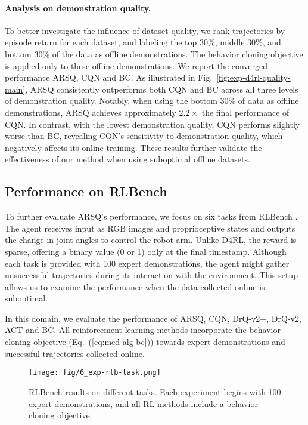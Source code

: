 \paragraph{Analysis on demonstration quality.}
To better investigate the influence of dataset quality, we rank trajectories by episode return for each dataset, and labeling the top $30$\%, middle $30$\%, and bottom $30$\% of the data as offline demonstrations.
The behavior cloning objective is applied only to these offline demonstrations. 
We report the converged performance ARSQ, CQN and BC.
As illustrated in Fig.~\ref{fig:exp-d4rl-quality-main}, ARSQ consistently outperforms both CQN and BC across all three levels of demonstration quality. 
Notably, when using the bottom $30$\% of data as offline demonstrations, ARSQ achieves approximately $2.2 \times$ the final performance of CQN.
In contrast, with the lowest demonstration quality, CQN performs slightly worse than BC, revealing CQN's sensitivity to demonstration quality, which negatively affects its online training. 
These results further validate the effectiveness of our method when using suboptimal offline datasets.


\subsection{Performance on RLBench}
\label{sec:exp-rlb}

To further evaluate ARSQ's performance, we focus on six tasks from RLBench \cite{RLBench}. 
The agent receives input as RGB images and proprioceptive states and outputs the change in joint angles to control the robot arm. 
Unlike D4RL, the reward is sparse, offering a binary value (0 or 1) only at the final timestamp. 
Although each task is provided with 100 expert demonstrations, the agent might gather unsuccessful trajectories during its interaction with the environment. 
This setup allows us to examine the performance when the data collected online is suboptimal.

In this domain, we evaluate the performance of ARSQ, CQN, DrQ-v2+, DrQ-v2, ACT and BC.
All reinforcement learning methods incorporate the behavior cloning objective (Eq.~(\ref{eq:med-alg-bc})) towards expert demonstrations and successful trajectories collected online.

\begin{figure*}[ht]
    \centering
    \texttt{[image: fig/6\_exp-rlb-task.png]}
    \vspace{-1em}
    \caption{RLBench results on different tasks. Each experiment begins with 100 expert demonstrations, and all RL methods include a behavior cloning objective.}
    \label{fig:exp-rlb-task}
    \vspace{-1em}
\end{figure*}

